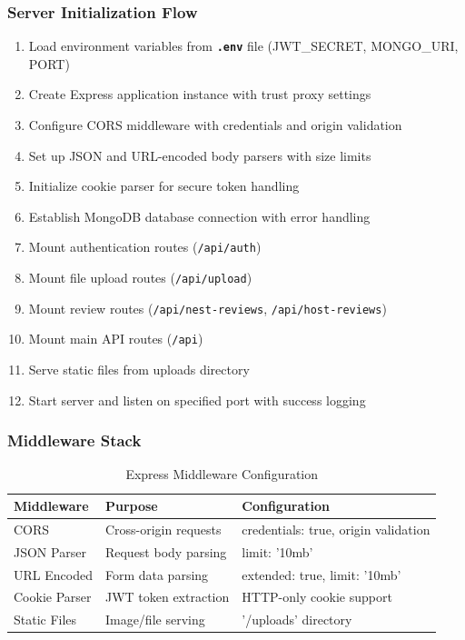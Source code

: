 \documentclass[12pt,a4paper]{article}
\newcommand{\code}[1]{\texttt{#1}}
\newcommand{\file}[1]{\textbf{\texttt{#1}}}
\begin{document}
\subsubsection{Server Initialization Flow}
\begin{enumerate}
\item Load environment variables from \file{.env} file (JWT\_SECRET, MONGO\_URI, PORT)
\item Create Express application instance with trust proxy settings
\item Configure CORS middleware with credentials and origin validation
\item Set up JSON and URL-encoded body parsers with size limits
\item Initialize cookie parser for secure token handling
\item Establish MongoDB database connection with error handling
\item Mount authentication routes (\code{/api/auth})
\item Mount file upload routes (\code{/api/upload})
\item Mount review routes (\code{/api/nest-reviews}, \code{/api/host-reviews})
\item Mount main API routes (\code{/api})
\item Serve static files from uploads directory
\item Start server and listen on specified port with success logging
\end{enumerate}

\subsubsection{Middleware Stack}
\begin{table}[H]
\centering
\small
\begin{tabular}{@{}lll@{}}
\toprule
\textbf{Middleware} & \textbf{Purpose} & \textbf{Configuration} \\
\midrule
CORS & Cross-origin requests & credentials: true, origin validation \\
JSON Parser & Request body parsing & limit: '10mb' \\
URL Encoded & Form data parsing & extended: true, limit: '10mb' \\
Cookie Parser & JWT token extraction & HTTP-only cookie support \\
Static Files & Image/file serving & '/uploads' directory \\
\bottomrule
\end{tabular}
\caption{Express Middleware Configuration}
\label{tab:middleware-config}
\end{table}
\end{document}
